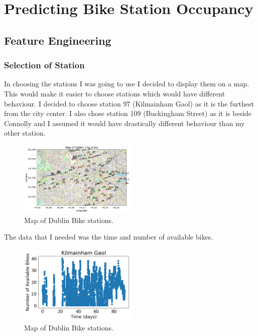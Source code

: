\maketitle


\section{Predicting Bike Station Occupancy}
\subsection{Feature Engineering}
\subsubsection{Selection of Station}
In choosing the stations I was going to use I decided to display them on a map.
This would make it easier to choose stations which would have different behaviour.
I decided to choose station 97 (Kilmainham Gaol) as it is the furthest from the city center.
I also chose station 109 (Buckingham Street) as it is beside Connolly and I assumed it would have drastically different behaviour than my other station.

\begin{figure}[H]
\centering
\includegraphics[width=0.5\textwidth]{images/map.png}
\caption{Map of Dublin Bike stations.}
\end{figure}

The data that I needed was the time and number of available bikes.

\begin{figure}[H]
    \centering
    \includegraphics[width=0.5\textwidth]{images/kilmainham data.png}
    \caption{Map of Dublin Bike stations.}
    \end{figure}
\par 

